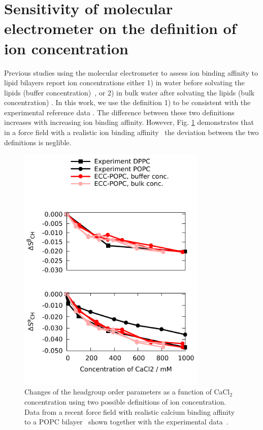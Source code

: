 \documentclass[journal=jpcbfk,manuscript=article]{achemso}
\begin{document}
\section{Sensitivity of molecular electrometer on the definition of ion concentration}\label{concentrationDEFsection}
Previous studies using the molecular electrometer to assess ion binding affinity to lipid
bilayers report ion concentrations either 1) in water before solvating the lipids (buffer concentration)~\cite{akutsu81,roux90,catte16},
or 2) in bulk water after solvating the lipids (bulk concentration) \cite{altenbach84,melcr18}.
In this work, we use the definition 1) to be consistent with the experimental reference data \cite{roux90}. The difference between these two definitions increases
with increasing ion binding affinity. However, Fig. \ref{concentrationDEFfigure} demonstrates that 
in a force field with a realistic ion binding affinity~\cite{melcr18} the deviation between the two definitions is neglible.
\begin{figure}[]
  \centering
  \includegraphics[width=9cm]{../Figs/OP_ECC_POPC_DPPC_water_conc2_dppc_bulk.pdf}
  \caption{\label{concentrationDEFfigure}
    Changes of the headgroup order parameters as a function of CaCl$_2$ concentration using
    two possible definitions of ion concentration. Data from a recent force field
    with realistic calcium binding affinity to a POPC bilayer~\cite{melcr18}
    shown together with the experimental data~\cite{akutsu81,altenbach84}. 
  }
\end{figure}
\end{document}

